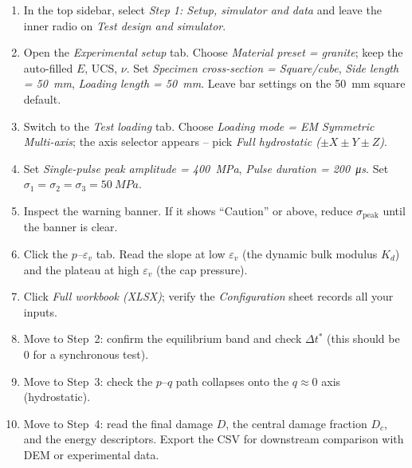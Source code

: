 \documentclass[11pt,a4paper]{article}
\providecommand{\SI}[2]{\qty{#1}{#2}}
\newcommand{\sig}{\sigma}
\newcommand{\eps}{\varepsilon}
\newcommand{\sigpeak}{\sig_{\text{peak}}}
\begin{document}
\begin{stepbox}
\begin{enumerate}[leftmargin=*, itemsep=3pt]
  \item In the top sidebar, select \emph{Step 1: Setup, simulator and data}
        and leave the inner radio on \emph{Test design and simulator}.
  \item Open the \emph{Experimental setup} tab. Choose \emph{Material preset =
        granite}; keep the auto-filled $E$, UCS, $\nu$. Set \emph{Specimen
        cross-section = Square/cube}, \emph{Side length = \SI{50}{mm}},
        \emph{Loading length = \SI{50}{mm}}. Leave bar settings on the
        \SI{50}{mm} square default.
  \item Switch to the \emph{Test loading} tab. Choose \emph{Loading mode = EM
        Symmetric Multi-axis}; the axis selector appears -- pick \emph{Full
        hydrostatic ($\pm X \pm Y \pm Z$)}.
  \item Set \emph{Single-pulse peak amplitude = \SI{400}{MPa}}, \emph{Pulse
        duration = \SI{200}{\micro s}}. Set
        $\sig_1 = \sig_2 = \sig_3 = \SI{50}{MPa}$.
  \item Inspect the warning banner. If it shows ``Caution'' or above, reduce
        $\sigpeak$ until the banner is clear.
  \item Click the \emph{$p$--$\eps_v$} tab. Read the slope at low $\eps_v$
        (the dynamic bulk modulus $K_d$) and the plateau at high $\eps_v$
        (the cap pressure).
  \item Click \emph{Full workbook (XLSX)}; verify the \emph{Configuration}
        sheet records all your inputs.
  \item Move to Step~2: confirm the equilibrium band and check
        $\Delta t^\ast$ (this should be 0 for a synchronous test).
  \item Move to Step~3: check the $p$--$q$ path collapses onto the
        $q \approx 0$ axis (hydrostatic).
  \item Move to Step~4: read the final damage $D$, the central damage
        fraction $D_c$, and the energy descriptors. Export the CSV for
        downstream comparison with DEM or experimental data.
\end{enumerate}
\end{stepbox}

\newpage
\end{document}
